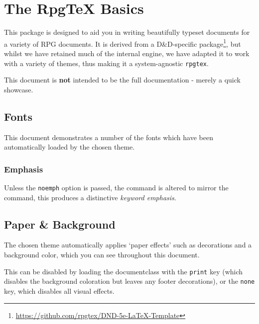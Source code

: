 
{}
\maketitle


\NewDocumentCommand{}



\chapter{The RpgTeX Basics}


	 This package is designed to aid you in writing beautifully typeset documents for a variety of RPG documents. It is derived from {a D\&D-specific package}\footnote{\url{https://github.com/rpgtex/DND-5e-LaTeX-Template}}, but whilst we have retained much of the internal engine, we have adapted it to work with a variety of themes, thus making it a system-agnostic \verb|rpgtex|.

	This document is \textbf{not} intended to be the full documentation - merely a quick showcase.

	\section{Fonts}

		This document demonstrates a number of the fonts which have been automatically loaded by the chosen theme.

		\subsection{Emphasis}

			Unless the \texttt{noemph} option is passed, the  command is altered to mirror the  command, this produces a distinctive \emph{keyword emphasis}.

	\section{Paper \& Background}

		The chosen theme automatically applies `paper effects' such as decorations and a background color, which you can see throughout this document.

		This can be disabled by loading the documentclass with the \texttt{print} key (which disables the background coloration but leaves any footer decorations), or the \texttt{none} key, which disables all visual effects.

